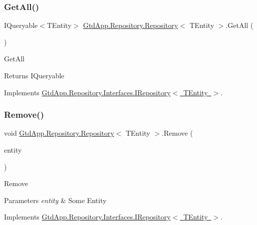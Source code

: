 \subsubsection{\texorpdfstring{Get\+All()}{GetAll()}}
{\footnotesize\ttfamily I\+Queryable$<$T\+Entity$>$ \mbox{\hyperlink{class_gtd_app_1_1_repository_1_1_repository}{Gtd\+App.\+Repository.\+Repository}}$<$ T\+Entity $>$.Get\+All (\begin{DoxyParamCaption}{ }\end{DoxyParamCaption})}



Get\+All 

\begin{DoxyReturn}{Returns}
I\+Queryable
\end{DoxyReturn}


Implements \mbox{\hyperlink{interface_gtd_app_1_1_repository_1_1_interfaces_1_1_i_repository_a1c97e47c04c2d00061a30fad1aabb977}{Gtd\+App.\+Repository.\+Interfaces.\+I\+Repository$<$ T\+Entity $>$}}.

\mbox{\label{class_gtd_app_1_1_repository_1_1_repository_a8a1208608bc26394b65892edc3a79fa4}} 
\subsubsection{\texorpdfstring{Remove()}{Remove()}}
{\footnotesize\ttfamily void \mbox{\hyperlink{class_gtd_app_1_1_repository_1_1_repository}{Gtd\+App.\+Repository.\+Repository}}$<$ T\+Entity $>$.Remove (\begin{DoxyParamCaption}\item[{T\+Entity}]{entity }\end{DoxyParamCaption})}



Remove 


\begin{DoxyParams}{Parameters}
{\em entity} & Some Entity\\
\hline
\end{DoxyParams}


Implements \mbox{\hyperlink{interface_gtd_app_1_1_repository_1_1_interfaces_1_1_i_repository_ae140e5af29d395235ea159f58ecf5b47}{Gtd\+App.\+Repository.\+Interfaces.\+I\+Repository$<$ T\+Entity $>$}}.

